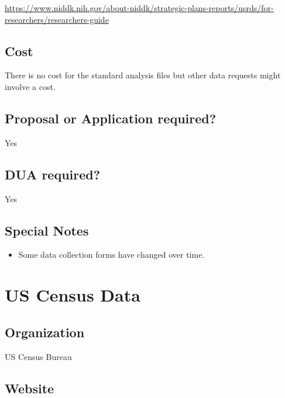 \documentclass[
]{book}
\providecommand{\tightlist}{%
  \setlength{\itemsep}{0pt}\setlength{\parskip}{0pt}}
\begin{document}
\url{https://www.niddk.nih.gov/about-niddk/strategic-plans-reports/usrds/for-researchers/researchers-guide}

\hypertarget{cost-93}{%
\section{Cost}\label{cost-93}}

There is no cost for the standard analysis files but other data requests might involve a cost.

\hypertarget{proposal-or-application-required-93}{%
\section{Proposal or Application required?}\label{proposal-or-application-required-93}}

Yes

\hypertarget{dua-required-93}{%
\section{DUA required?}\label{dua-required-93}}

Yes

\hypertarget{special-notes-93}{%
\section{Special Notes}\label{special-notes-93}}

\begin{itemize}
\tightlist
\item
  Some data collection forms have changed over time.
\end{itemize}

\mainmatter

\hypertarget{us-census-data}{%
\chapter{US Census Data}\label{us-census-data}}

\hypertarget{organization-94}{%
\section{Organization}\label{organization-94}}

US Census Bureau

\hypertarget{website-94}{%
\section{Website}\label{website-94}}
\end{document}

